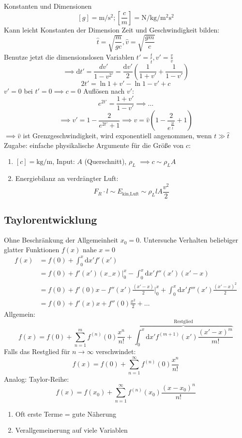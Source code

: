 \documentclass[a4paper]{scrartcl}
\renewcommand{\d}{\mathrm{d}}
\theoremstyle{definition}
\theoremstyle{plain}
\theoremstyle{remark}
\theoremstyle{remark}
\begin{document}
Konstanten und Dimensionen
\[[g] = \si{\meter\per\second\squared};[\frac{c}{m}] = \si{\newton\per\kilo\gram\per\meter\squared\second\squared}\]
Kann leicht Konstanten der Dimension Zeit und Geschwindigkeit bilden:
\[\hat{t} = \sqrt{\frac{m}{g c}},\hat{v} = \sqrt{\frac{g m}{c}}\]
Benutze jetzt die dimensionslosen Variablen $t' = \frac{t}{\hat{t}},v'=\frac{v}{\hat{v}}$
\[\implies \d t' = \frac{d v'}{1 - v^{2\prime}} = \frac{\d v'}{2}(\frac{1}{1 + v'} + \frac{1}{1 - v'})\]
\[2t' = \ln{1 + v'} - \ln{1 - v'} + c\]
$v' = 0$ bei $t' = 0 \implies c = 0$
Auflösen nach $v'$: \[e^{2t'} = \frac{1 + v'}{1 - v'} \implies \ldots\]
\[\implies v' = 1 - \frac{2}{e^{2t'} + 1} \implies v = \hat{v}(1 - \frac{2}{e^{\frac{2t}{\hat{t}}}} + 1)\]
$\implies \hat{v}$ ist Grenzgeschwindigkeit, wird exponentiell angenommen, wenn $t \gg \hat{t}$ \\

Zugabe: einfache physikalische Argumente für die Größe von $c$:
\begin{enumerate}
\item $[c] = \si{\kilo\gram\per\meter}$, Input: $A$ (Querschnitt), $\rho_L$
                 $\implies c \sim \rho_L A$
\item Energiebilanz an verdrängter Luft: \[F_R\cdot l \sim E_{\text{kin,Luft}}\sim\rho_L l A \frac{v^2}{2}\]
\end{enumerate}
\subsection{Taylorentwicklung}
\label{sec-3-4}
Ohne Beschränkung der Allgemeinheit $x_0 = 0$. Untersuche Verhalten beliebiger glatter Funktionen $f(x)$ nahe $x = 0$
\begin{align*}
f(x) &= f(0) + \int_0^x\d x' f'(x') \\
&= f(0) + f'(x')(x_ - x)\Big|_0^x - \int_0^x\d x' f''(x')(x'-x) \\
&= f(0) + f'(0)x - f''(x')\frac{(x' - x)}{2}\Big|_0^x + \int_0^x\d x' f'''(x')\frac{(x' - x)^2}{2} \\
&= f(0) + f'(x)x + f''(0)\frac{x^2}{2} + \ldots
\end{align*}
Allgemein:
\[f(x) = f(0) + \sum_{n=1}^m f^{(n)}(0)\frac{x^n}{n!}+\overbrace{\int_0^x \d x' f^{(m+1)}(x')\frac{(x' - x)^m}{m!}}^{\text{Restglied}}\]
Falls das Restglied für $n\to\infty$ verschwindet:
\[f(x) = f(0) + \sum_{n=1}^\infty f^{(n)}(0)\frac{x^n}{n!}\]
Analog:
Taylor-Reihe: \[f(x) = f(x_0) + \sum_{n=1}^\infty f^{(n)}(x_0)\frac{(x - x_0)^n}{n!}\]
\begin{enumerate}
\item Oft erste Terme = gute Näherung
\item Verallgemeinerung auf viele Variablen
\end{enumerate}
\end{document}
